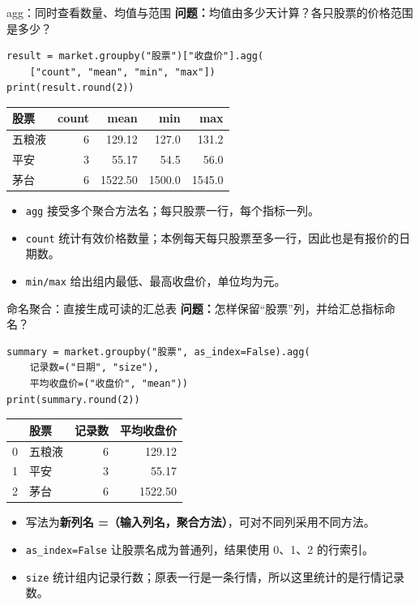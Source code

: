\documentclass[9pt]{ctexbeamer}
\begin{document}
\begin{frame}[fragile]{agg：同时查看数量、均值与范围}
\small \textbf{问题：}均值由多少天计算？各只股票的价格范围是多少？
\begin{lstlisting}
result = market.groupby("股票")["收盘价"].agg(
    ["count", "mean", "min", "max"])
print(result.round(2))
\end{lstlisting}
\begin{center}
\begin{tabular}{lrrrr}
\toprule
股票 & count & mean & min & max \\
\midrule
五粮液 & 6 & 129.12 & 127.0 & 131.2 \\
平安 & 3 & 55.17 & 54.5 & 56.0 \\
茅台 & 6 & 1522.50 & 1500.0 & 1545.0 \\
\bottomrule
\end{tabular}
\end{center}
\begin{itemize}
\item \texttt{agg} 接受多个聚合方法名；每只股票一行，每个指标一列。
\item \texttt{count} 统计有效价格数量；本例每天每只股票至多一行，因此也是有报价的日期数。
\item \texttt{min/max} 给出组内最低、最高收盘价，单位均为元。
\end{itemize}
\end{frame}

\begin{frame}[fragile]{命名聚合：直接生成可读的汇总表}
\small \textbf{问题：}怎样保留“股票”列，并给汇总指标命名？
\begin{lstlisting}
summary = market.groupby("股票", as_index=False).agg(
    记录数=("日期", "size"),
    平均收盘价=("收盘价", "mean"))
print(summary.round(2))
\end{lstlisting}
\begin{center}
\begin{tabular}{rlrr}
\toprule
 & 股票 & 记录数 & 平均收盘价 \\
\midrule
0 & 五粮液 & 6 & 129.12 \\
1 & 平安 & 3 & 55.17 \\
2 & 茅台 & 6 & 1522.50 \\
\bottomrule
\end{tabular}
\end{center}
\begin{itemize}
\item 写法为\textbf{新列名 =（输入列名，聚合方法）}，可对不同列采用不同方法。
\item \texttt{as\_index=False} 让股票名成为普通列，结果使用 0、1、2 的行索引。
\item \texttt{size} 统计组内记录行数；原表一行是一条行情，所以这里统计的是行情记录数。
\end{itemize}
\end{frame}
\end{document}
